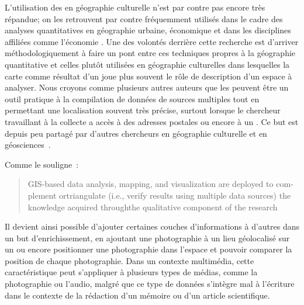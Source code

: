 L'utilisation des \sig{} en géographie culturelle n'est par contre pas encore très répandue; on les retrouvent par contre fréquemment utilisés dans le cadre des analyses quantitatives en géographie urbaine, économique et dans les disciplines affiliées comme l'économie \missref{}. 
Une des volontés derrière cette recherche est d'arriver méthodologiquement à faire un pont entre ces techniques propres à la géographie quantitative et celles plutôt utilisées en géographie culturelles dans lesquelles la carte comme résultat d'un \sig{} joue plus souvent le rôle de description d'un espace à analyser. 
Nous croyons comme plusieurs autres auteurs \citep[4]{Elwood2009} que les \sig{} peuvent être un outil pratique à la compilation de données de sources multiples tout en permettant une localisation souvent très précise, surtout lorsque le chercheur travaillant à la collecte a accès à des adresses postales ou encore à un \gps.
Ce but est depuis peu partagé par d'autres chercheurs en géographie culturelle et en géosciences~\citep{Perkins2003,Elwood2011,Elwood2009,Kwan2008,Madden2009,Knigge2006,Jung2010}.


Comme le souligne~\cite{Kwan2008}: \foreignblockquote{english}[{\citeyear[444]{Kwan2008}}][.]{GIS-based data   analysis, mapping, and visualization are deployed to complement ortriangulate   (i.e., verify results using multiple data sources) the knowledge acquired   throughthe qualitative component of the research} 
Il devient ainsi possible d'ajouter certaines couches d'informations à d'autres dans un but d'enrichissement, en ajoutant une photographie à un lieu géolocalisé sur un \sig{} ou encore positionner une photographie dans l'espace et pouvoir comparer la position de chaque photographie. 
Dans un contexte multimédia, cette caractéristique peut s'appliquer à plusieurs types de médias, comme la photographie ou l'audio, malgré que ce type de données s'intègre mal à l'écriture dans le contexte de la rédaction d'un mémoire ou d'un article scientifique.

